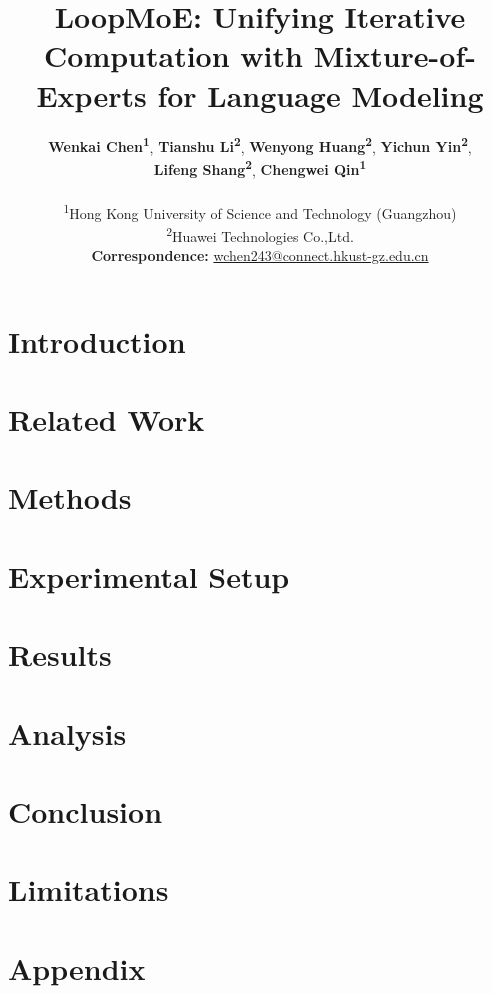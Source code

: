 \documentclass[11pt]{article}
\title{LoopMoE: Unifying Iterative Computation with Mixture-of-Experts for Language Modeling}
\author{
 \textbf{Wenkai Chen\textsuperscript{1}},
 \textbf{Tianshu Li\textsuperscript{2}},
 \textbf{Wenyong Huang\textsuperscript{2}},
 \textbf{Yichun Yin\textsuperscript{2}},
\\
 \textbf{Lifeng Shang\textsuperscript{2}},
 \textbf{Chengwei Qin\textsuperscript{1}}
\\
\\
 \textsuperscript{1}Hong Kong University of Science and Technology (Guangzhou)\\
 \textsuperscript{2}Huawei Technologies Co.,Ltd.
\\
 \small{
   \textbf{Correspondence:} \href{mailto:email@domain}{wchen243@connect.hkust-gz.edu.cn}
 }
}
\begin{document}
\maketitle
\begin{abstract}

\end{abstract}

\section{Introduction}
\label{sec:intro}


\section{Related Work}
\label{sec:bg}


\section{Methods}
\label{sec:method}


\section{Experimental Setup}
\label{sec:exp_setup}


\section{Results}
\label{sec:results}


\section{Analysis}
\label{sec:analysis}


\section{Conclusion}
\label{sec:conclusion}


\section*{Limitations}
\label{sec:limitations}


%

% 

\appendix

\section{Appendix}
\label{sec:appendix}

\end{document}
